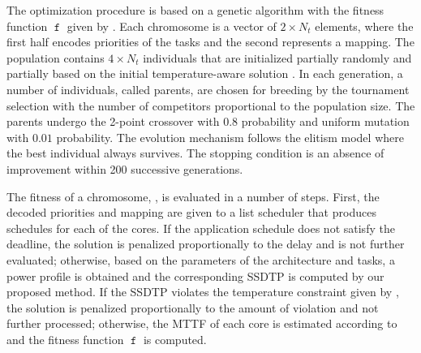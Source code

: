 The optimization procedure is based on a genetic algorithm \cite{schmitz2004} with the fitness function $\mttf$ given by . Each chromosome is a vector of $2 \times N_t$ elements, where the first half encodes priorities of the tasks and the second represents a mapping. The population contains $4 \times N_t$ individuals that are initialized partially randomly and partially based on the initial temperature-aware solution \cite{xie2006}. In each generation, a number of individuals, called parents, are chosen for breeding by the tournament selection with the number of competitors proportional to the population size. The parents undergo the 2-point crossover with $0.8$ probability and uniform mutation with $0.01$ probability. The evolution mechanism follows the elitism model where the best individual always survives. The stopping condition is an absence of improvement within 200 successive generations.

The fitness of a chromosome, , is evaluated in a number of steps. First, the decoded priorities and mapping are given to a list scheduler that produces schedules for each of the cores. If the application schedule does not satisfy the deadline, the solution is penalized proportionally to the delay and is not further evaluated; otherwise, based on the parameters of the architecture and tasks, a power profile is obtained and the corresponding SSDTP is computed by our proposed method. If the SSDTP violates the temperature constraint given by , the solution is penalized proportionally to the amount of violation and not further processed; otherwise, the MTTF of each core is estimated according to  and the fitness function $\mttf$ is computed.
